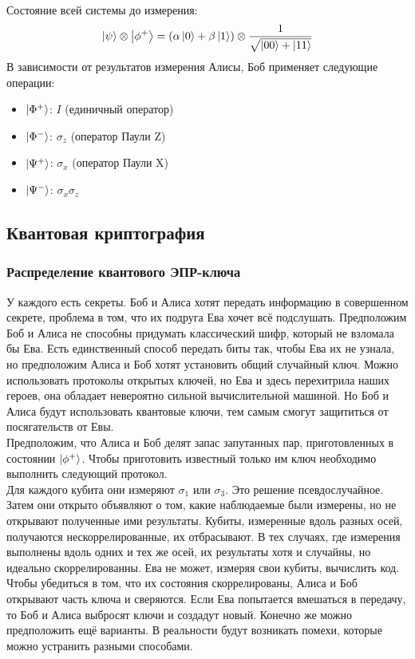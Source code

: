 \documentclass[12pt,a4paper]{article}
\begin{document}
		Состояние всей системы до измерения:\\
		\begin{equation}
	\ket{\psi} \otimes\ket{\phi^{+}}=(\alpha\ket{0} + \beta \ket{1})\otimes \frac{1}{\sqrt{\ket{00} +\ket{11}}}
			\end{equation}
		В зависимости от результатов измерения Алисы, Боб применяет следующие операции:
		\begin{itemize}
			\item $\ket{\Phi^{+}}$: $I$ (единичный оператор)
			\item $\ket{\Phi^{-}}$: $\sigma_{z}$ (оператор Паули Z)
			\item $\ket{\Psi^{+}}$: $\sigma_{x}$ (оператор Паули X)
			\item $\ket{\Psi^{-}}$: $\sigma_{x} \sigma_{z}$
		\end{itemize}
		\subsection{Квантовая криптография}
		\subsubsection{Распределение квантового ЭПР-ключа}
		У каждого есть секреты. Боб и Алиса хотят передать информацию в совершенном секрете, проблема в том, что их подруга Ева хочет всё подслушать. Предположим Боб и Алиса не способны придумать классический шифр, который не взломала бы Ева. Есть единственный способ передать биты так, чтобы Ева их не узнала, но предположим Алиса и Боб хотят установить общий случайный ключ. Можно использовать протоколы открытых ключей, но Ева и здесь перехитрила наших героев, она обладает невероятно сильной вычислительной машиной. Но Боб и Алиса будут использовать квантовые ключи, тем самым смогут защититься от посягательств от Евы. \\
		\indent Предположим, что Алиса и Боб делят запас запутанных пар, приготовленных в состоянии $\ket{\phi^{+}}$. Чтобы приготовить известный только им ключ необходимо выполнить следующий протокол.\\
		\indent Для каждого кубита они измеряют $\sigma_{1}$ или $\sigma_{3}$. Это решение псевдослучайное. Затем они открыто объявляют о том, какие наблюдаемые были измерены, но не открывают полученные ими результаты. Кубиты, измеренные вдоль разных осей, получаются нескоррелированные, их отбрасывают. В тех случаях, где измерения выполнены вдоль одних и тех же осей, их результаты хотя и случайны, но идеально скоррелированны. Ева не может, измеряя свои кубиты, вычислить код. Чтобы убедиться в том, что их состояния скоррелированы, Алиса и Боб открывают часть ключа и сверяются. Если Ева попытается вмешаться в передачу, то Боб и Алиса выбросят ключи и создадут новый. Конечно же можно предположить ещё варианты. В реальности будут возникать помехи, которые можно устранить разными способами.
\end{document}
